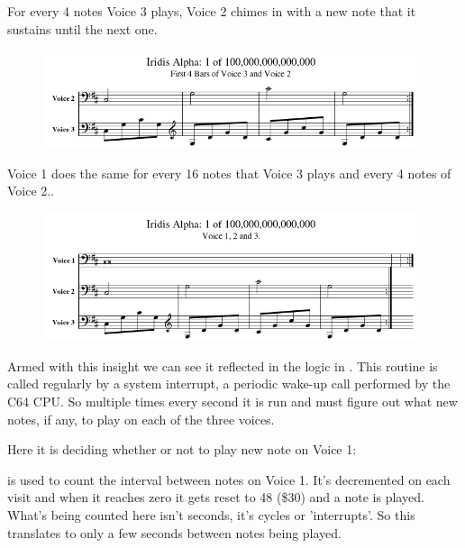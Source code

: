 For every 4 notes Voice 3 plays, Voice 2 chimes in with a new note that it sustains until the next one.

\begin{figure}[H]
{
  \begin{adjustbox}{width=11cm,center}
  \includegraphics[width=11cm]{music/Voice_2_Part.png}%
    \end{adjustbox}
}
\end{figure}

Voice 1 does the same for every 16 notes that Voice 3 plays and every 4 notes of Voice 2..

\begin{figure}[H]
{
  \begin{adjustbox}{width=11cm,center}
  \includegraphics[width=11cm]{music/Voice_1_Part.png}%
    \end{adjustbox}
}
\end{figure}

Armed with this insight we can see it reflected in the logic in . This routine
is called regularly by a system interrupt, a periodic wake-up call performed by the C64 CPU. So multiple
times every second it is run and must figure out what new notes, if any, to play on each of the three
voices.

Here it is deciding whether or not to play new note on Voice 1:

%


 is used to count the interval between notes on Voice 1. It's decremented on each
visit and when it reaches zero it gets reset to 48 (\$30) and a note is played. What's being counted here isn't
seconds, it's cycles or 'interrupts'. So this translates to only a few seconds between notes being played.

